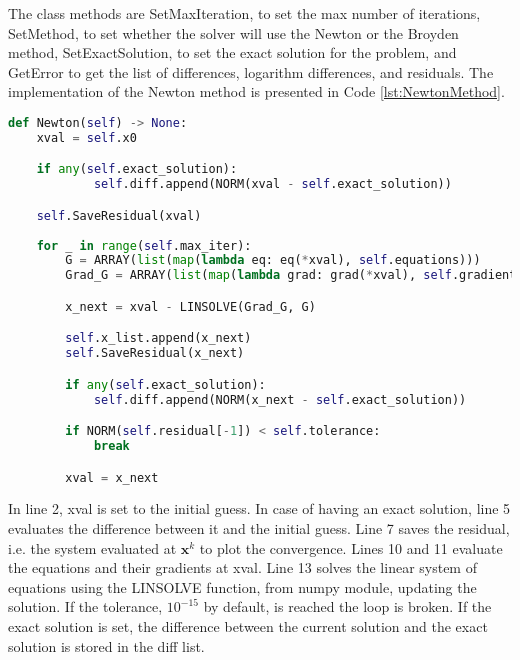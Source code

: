The class methods are SetMaxIteration, to set the max number of iterations, SetMethod, to set whether the solver will use the Newton or the Broyden method, SetExactSolution, to set the exact solution for the problem, and GetError to get the list of differences, logarithm differences, and residuals. The implementation of the Newton method is presented in Code \ref{lst:NewtonMethod}.
\begin{lstlisting}[language=Python, caption=Newton method implementation, label=lst:NewtonMethod]
def Newton(self) -> None:
    xval = self.x0

    if any(self.exact_solution):
            self.diff.append(NORM(xval - self.exact_solution))

    self.SaveResidual(xval)
                
    for _ in range(self.max_iter):
        G = ARRAY(list(map(lambda eq: eq(*xval), self.equations)))
        Grad_G = ARRAY(list(map(lambda grad: grad(*xval), self.gradients)))

        x_next = xval - LINSOLVE(Grad_G, G)

        self.x_list.append(x_next)
        self.SaveResidual(x_next)

        if any(self.exact_solution):
            self.diff.append(NORM(x_next - self.exact_solution))

        if NORM(self.residual[-1]) < self.tolerance:
            break

        xval = x_next
\end{lstlisting}

In line 2, xval is set to the initial guess. In case of having an exact solution, line 5 evaluates the difference between it and the initial guess. Line 7 saves the residual, i.e. the system evaluated at $\bm{x}^k$ to plot the convergence. Lines 10 and 11 evaluate the equations and their gradients at xval. Line 13 solves the linear system of equations using the LINSOLVE function, from numpy module, updating the solution. If the tolerance, $10^{-15}$ by default, is reached the loop is broken. If the exact solution is set, the difference between the current solution and the exact solution is stored in the diff list. 


